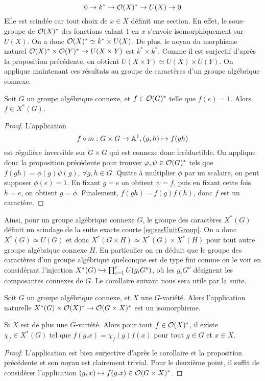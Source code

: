 \begin{equation}\label{eq:sesUnitGroup}
0\rightarrow k^* \rightarrow \mathcal{O}(X)^*\rightarrow U(X) \rightarrow 0
\end{equation}
Elle est scindée car tout choix de $x\in X$ définit une section. En effet, le sous-groupe de $\mathcal{O}(X)^*$ des fonctions valant $1$ en $x$ s'envoie isomorphiquement sur $U(X)$. On a donc $\mathcal{O}(X)^*\simeq k^*\times U(X)$. De plus, le noyau du morphisme naturel $\mathcal{O}(X)^*\times\mathcal{O}(Y)^*\rightarrow U(X\times Y)$ est $k^*\times k^*$. Comme il est surjectif d'après la proposition précédente, on obtient $U(X\times Y)\simeq U(X)\times U(Y)$.
On applique maintenant ces résultats au groupe de caractères d'un groupe algébrique connexe. 


\begin{prop}
Soit $G$ un groupe algébrique connexe, et $f\in \mathcal{O}(G)^*$ telle que $f(e)=1$. Alors $f\in X^*(G)$.
\end{prop}
\begin{proof}
L'application
$$f\circ m:G\times G\rightarrow \mathbb{A}^1, (g,h)\mapsto f(gh)$$
est régulière inversible sur $G\times G$ qui est connexe donc irréductible. On applique donc la proposition précédente pour trouver $\varphi,\psi \in \mathcal{O}(G)^*$ tels que $f(gh)=\phi(g)\psi(g),\,\forall g,h\in G$. Quitte à multiplier $\phi$ par un scalaire, on peut supposer $\phi(e)=1$. En fixant $g=e$ on obtient $\psi=f$, puis en fixant cette fois $h=e$, on obtient $g=\phi$. Finalement, $f(gh)=f(g)f(h)$, donc $f$ est un caractère.
\end{proof}

Ainsi, pour un groupe algébrique connexe $G$, le groupe des caractères $X^*(G)$ définit un scindage de la suite exacte courte \ref{eq:sesUnitGroup}. On a donc $X^*(G)\simeq U(G)$ et donc $X^*(G\times H)\simeq X^*(G)\times X^*(H)$ pour tout autre groupe algébrique connexe $H$. En particulier on en déduit que le groupe des caractères d'un groupe algébrique quelconque est de type fini comme on le voit en considérant l'injection $X^*(G)\xhookrightarrow{} \prod_{i=1}^rU(g_iG^o)$, où les $g_iG^o$ désignent les composantes connexes de $G$. Le corollaire suivant nous sera utile par la suite.

\begin{cor}\label{rosenlicht1}
Soit $G$ un groupe algébrique connexe, et $X$ une $G$-variété. Alors l'application naturelle $X^*(G)\times \mathcal{O}(X)^*\rightarrow \mathcal{O}(G\times X)^*$ est un isomorphisme.

Si $X$ est de plus une $G$-variété. Alors pour tout $f\in \mathcal{O}(X)^*$, il existe $\chi_f\in X^*(G)$ tel que $f(g.x)=\chi_f(g)f(x)$ pour tout $g\in G$ et $x\in X$.
\end{cor}
\begin{proof}
L'application est bien surjective d'après le corollaire et la proposition précédente et son noyau est clairement trivial. Pour le deuxième point, il suffit de considérer l'application $(g,x)\mapsto f(g.x)\in \mathcal{O}(G\times X)^*$.
\end{proof}
